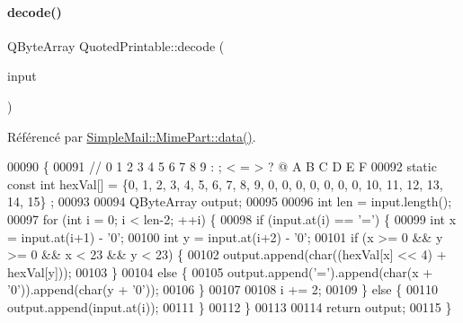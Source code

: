 \paragraph{\texorpdfstring{decode()}{decode()}}
{\footnotesize\ttfamily Q\+Byte\+Array Quoted\+Printable\+::decode (\begin{DoxyParamCaption}\item[{const Q\+Byte\+Array \&}]{input }\end{DoxyParamCaption})\hspace{0.3cm}{\ttfamily [static]}}



Référencé par \hyperlink{class_simple_mail_1_1_mime_part_ab6260fc481df5162673f1ac93ec92dac}{Simple\+Mail\+::\+Mime\+Part\+::data()}.


\begin{DoxyCode}
00090 \{
00091     \textcolor{comment}{//                           0  1  2  3  4  5  6  7  8  9  :  ;  <  =  >  ?  @  A   B   C   D   E   F}
00092     \textcolor{keyword}{static} \textcolor{keyword}{const} \textcolor{keywordtype}{int} hexVal[] = \{0, 1, 2, 3, 4, 5, 6, 7, 8, 9, 0, 0, 0, 0, 0, 0, 0, 10, 11, 12, 13, 14, 15\}
      ;
00093 
00094     QByteArray output;
00095 
00096     \textcolor{keywordtype}{int} len = input.length();
00097     \textcolor{keywordflow}{for} (\textcolor{keywordtype}{int} i = 0; i < len-2; ++i) \{
00098         \textcolor{keywordflow}{if} (input.at(i) == \textcolor{charliteral}{'='}) \{
00099             \textcolor{keywordtype}{int} x = input.at(i+1) - \textcolor{charliteral}{'0'};
00100             \textcolor{keywordtype}{int} y = input.at(i+2) - \textcolor{charliteral}{'0'};
00101             \textcolor{keywordflow}{if} (x >= 0 && y >= 0 && x < 23 && y < 23) \{
00102                 output.append(\textcolor{keywordtype}{char}((hexVal[x] << 4) + hexVal[y]));
00103             \}
00104             \textcolor{keywordflow}{else} \{
00105                 output.append(\textcolor{charliteral}{'='}).append(\textcolor{keywordtype}{char}(x + \textcolor{charliteral}{'0'})).append(\textcolor{keywordtype}{char}(y + \textcolor{charliteral}{'0'}));
00106             \}
00107 
00108             i += 2;
00109         \} \textcolor{keywordflow}{else} \{
00110             output.append(input.at(i));
00111         \}
00112     \}
00113 
00114     \textcolor{keywordflow}{return} output;
00115 \}
\end{DoxyCode}
\mbox{\label{class_simple_mail_1_1_quoted_printable_a8426b74cafe1c93232ac60d3f077c9e8}} 
